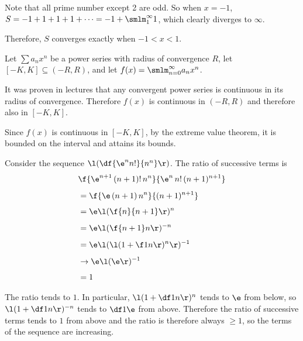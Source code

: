 \documentclass[a4paper]{article}
\begin{document}
Note that all prime number except 2 are odd. So when $x = -1$, $S = -1 + 1 + 1 + 1 + \cdots = -1 + \smlm_1^\infty 1$, which clearly diverges to $\infty$.

Therefore, $S$ converges exactly when $-1 < x < 1$.


Let $\sum a_n x^n$ be a power series with radius of convergence $R$, let $[-K, K] \subseteq (-R, R)$, and let $f(x) = \smlm_{n=0}^\infty a_n x^n$.


It was proven in lectures that any convergent power series is continuous in its radius of convergence. Therefore $f(x)$ is continuous in $(-R, R)$ and therefore also in $[-K, K]$.

Since $f(x)$ is continuous in $[-K, K]$, by the extreme value theorem, it is bounded on the interval and attains its bounds.


Consider the sequence $\l(\df{\e^n n!}{n^n}\r)$. The ratio of successive terms is \begin{align*}
& \f{\e^{n+1}\, (n+1)!\, n^n}{\e^n\, n!\, (n+1)^{n+1}}\\[1ex]
&= \f{\e\, (n+1)\, n^n}{(n+1)^{n+1}}\\[1ex]
&= \e \l(\f{n}{n+1}\r)^n\\[1ex]
&= \e \l(\f{n+1}n\r)^{-n}\\[1ex]
&= \e \l(\l(1 + \f1n\r)^n\r)^{-1}\\[1ex]
&\to \e \l(\e\r)^{-1}\\[1ex]
&= 1
\end{align*}

The ratio tends to $1$. In particular, $\l(1+\df1n\r)^n$ tends to $\e$ from below, so $\l(1+\df1n\r)^{-n}$ tends to $\df1\e$ from above. Therefore the ratio of successive terms tends to $1$ from above and the ratio is therefore always $\ge 1$, so the terms of the sequence are increasing.
\end{document}
